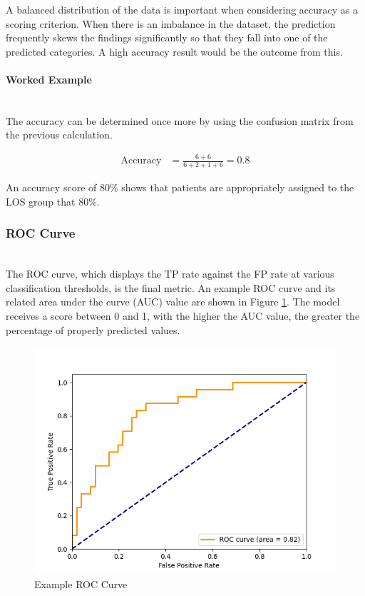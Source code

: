 \documentclass[../thesis.tex]{subfiles}
\begin{document}
A balanced distribution of the data is important when considering accuracy as a scoring criterion. When there is an imbalance in the dataset, the prediction frequently skews the findings significantly so that they fall into one of the predicted categories. A high accuracy result would be the outcome from this.

\paragraph{Worked Example}\\
The accuracy can be determined once more by using the confusion matrix from the previous calculation.

\begin{align}
    \text{Accuracy}  &= \frac{6+6}{6+2+1+6}= 0.8
\end{align}

An accuracy score of 80\% shows that patients are appropriately assigned to the LOS group that 80\%.


\subsubsection{ROC Curve}\\
The ROC curve, which displays the TP rate against the FP rate at various classification thresholds, is the final metric. An example ROC curve and its related area under the curve (AUC) value are shown in Figure \ref{fig:Example-ROCCurve}. The model receives a score between 0 and 1, with the higher the AUC value, the greater the percentage of properly predicted values.

\begin{figure}[h!]
    \centering
    \includegraphics[scale=0.65]{Chapters/Chapter3New/Figures/ROC Curve Example.png}
    \caption{Example ROC Curve}
    \label{fig:Example-ROCCurve}
\end{figure}
\end{document}
